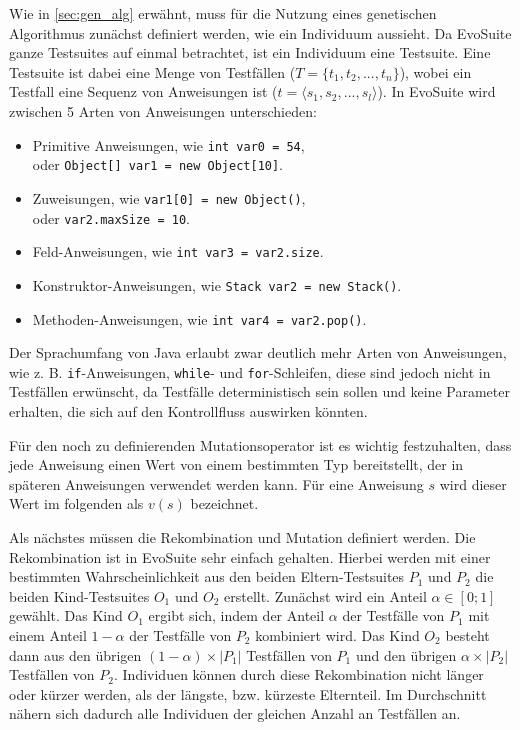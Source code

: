\documentclass[a4paper,11pt]{article}
\begin{document}
Wie in \cref{sec:gen_alg} erwähnt, muss für die Nutzung eines genetischen Algorithmus zunächst definiert werden, wie ein Individuum aussieht.
Da EvoSuite ganze Testsuites auf einmal betrachtet, ist ein Individuum eine Testsuite.
Eine Testsuite ist dabei eine Menge von Testfällen ($T = \{t_1, t_2, ..., t_n\}$), wobei ein Testfall eine Sequenz von Anweisungen ist ($t = \langle s_1, s_2, ..., s_l \rangle$).
In EvoSuite wird zwischen 5 Arten von Anweisungen unterschieden:
\begin{itemize}
	\item Primitive Anweisungen, wie \lstinline{int var0 = 54},\\
	oder \lstinline{Object[] var1 = new Object[10]}.
	\item Zuweisungen, wie \lstinline{var1[0] = new Object()},\\
	oder \lstinline{var2.maxSize = 10}.
	\item Feld-Anweisungen, wie \lstinline{int var3 = var2.size}.
	\item Konstruktor-Anweisungen, wie \lstinline{Stack var2 = new Stack()}.
	\item Methoden-Anweisungen, wie \lstinline{int var4 = var2.pop()}.
\end{itemize}
Der Sprachumfang von Java erlaubt zwar deutlich mehr Arten von Anweisungen, wie z. B. \lstinline{if}-Anweisungen, \lstinline{while}- und \lstinline{for}-Schleifen, diese sind jedoch nicht in Testfällen erwünscht, da Testfälle deterministisch sein sollen und keine Parameter erhalten, die sich auf den Kontrollfluss auswirken könnten.

Für den noch zu definierenden Mutationsoperator ist es wichtig festzuhalten, dass jede Anweisung einen Wert von einem bestimmten Typ bereitstellt, der in späteren Anweisungen verwendet werden kann.
Für eine Anweisung $s$ wird dieser Wert im folgenden als $v(s)$ bezeichnet.

Als nächstes müssen die Rekombination und Mutation definiert werden.
Die Rekombination ist in EvoSuite sehr einfach gehalten.
Hierbei werden mit einer bestimmten Wahrscheinlichkeit aus den beiden Eltern-Testsuites $P_1$ und $P_2$ die beiden Kind-Testsuites $O_1$ und $O_2$ erstellt.
Zunächst wird ein Anteil $\alpha \in [0;1]$ gewählt.
Das Kind $O_1$ ergibt sich, indem der Anteil $\alpha$ der Testfälle von $P_1$ mit einem Anteil $1 - \alpha$ der Testfälle von $P_2$ kombiniert wird.
Das Kind $O_2$ besteht dann aus den übrigen $(1 - \alpha) \times |P_1|$ Testfällen von $P_1$ und den übrigen $\alpha \times |P_2|$ Testfällen von $P_2$.
Individuen können durch diese Rekombination nicht länger oder kürzer werden, als der längste, bzw. kürzeste Elternteil.
Im Durchschnitt nähern sich dadurch alle Individuen der gleichen Anzahl an Testfällen an.
\end{document}
